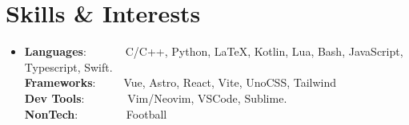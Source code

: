 \documentclass[a4paper,20pt]{article}
\begin{document}
\section{Skills \& Interests}
\begin{itemize}[leftmargin=0.15in, label={}]
  \item{
        \textbf{Languages}:~~~~~~~C/C++, Python, \LaTeX, Kotlin, Lua, Bash, JavaScript, Typescript, Swift. \\
        \textbf{Frameworks}:~~~~~Vue, Astro, React, Vite, UnoCSS, Tailwind \\
        \textbf{Dev Tools}:~~~~~~~ Vim/Neovim, VSCode, Sublime. \\
        \textbf{NonTech}:~~~~~~~~ Football
    }
\end{itemize}
\end{document}
